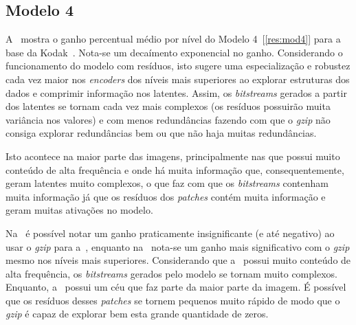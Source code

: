 \subsection{Modelo 4}
A~ mostra o ganho percentual médio por nível do Modelo 4~[\ref{res:mod4}] para a base da Kodak~\cite{kodak}. Nota-se um decaímento exponencial no ganho. Considerando o funcionamento do modelo com resíduos, isto sugere uma especialização e robustez cada vez maior nos \textit{encoders} dos níveis mais superiores ao explorar estruturas dos dados e comprimir informação nos latentes. Assim, os \textit{bitstreams} gerados a partir dos latentes se tornam cada vez mais complexos (os resíduos possuirão muita variância nos valores) e com menos redundâncias fazendo com que o \textit{gzip} não consiga explorar redundâncias bem ou que não haja muitas redundâncias. 

Isto acontece na maior parte das imagens, principalmente nas que possui muito conteúdo de alta frequência e onde há muita informação que, consequentemente, geram latentes muito complexos, o que faz com que os \textit{bitstreams} contenham muita informação já que os resíduos dos \textit{patches} contém muita informação e geram muitas ativações no modelo.


Na~ é possível notar um ganho praticamente insignificante (e até negativo) ao usar o \textit{gzip} para a~, enquanto na~ nota-se um ganho mais significativo com o \textit{gzip} mesmo nos níveis mais superiores. Considerando que a~ possui muito conteúdo de alta frequência, os \textit{bitstreams} gerados pelo modelo se tornam muito complexos. Enquanto, a~ possui um céu que faz parte da maior parte da imagem. É possível que os resíduos desses \textit{patches} se tornem pequenos muito rápido de modo que o \textit{gzip} é capaz de explorar bem esta grande quantidade de zeros.

